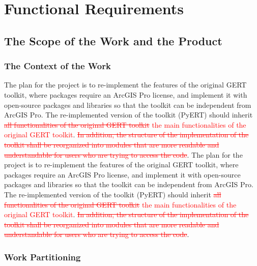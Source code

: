\documentclass[12pt, titlepage]{article}
\begin{document}
\section{Functional Requirements}
\subsection{The Scope of the Work and the Product}

\subsubsection{The Context of the Work}
The plan for the project is to re-implement the features of the original GERT toolkit, where packages require an ArcGIS Pro license, and implement it with open-source packages and libraries so that the toolkit can be independent from ArcGIS Pro. The re-implemented version of the toolkit (PyERT) should inherit \textcolor{red}{\sout{all functionalities of the original GERT toolkit} the main functionalities of the original GERT toolkit}. \textcolor{red}{\sout{In addition, the structure of the implementation of the toolkit shall be reorganized into modules that are more readable and understandable for users who are trying to access the code}}.
The plan for the project is to re-implement the features of the original GERT toolkit, where packages require an ArcGIS Pro license, and implement it with open-source packages and libraries so that the toolkit can be independent from ArcGIS Pro. The re-implemented version of the toolkit (PyERT) should inherit \textcolor{red}{\sout{all functionalities of the original GERT toolkit} the main functionalities of the original GERT toolkit}. \textcolor{red}{\sout{In addition, the structure of the implementation of the toolkit shall be reorganized into modules that are more readable and understandable for users who are trying to access the code}}.

\subsubsection{Work Partitioning}
\end{document}
